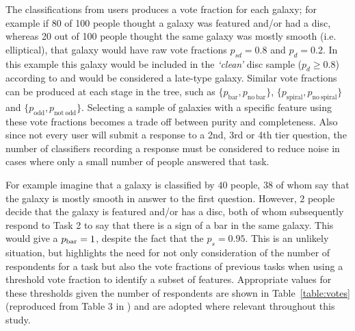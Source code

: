 
The classifications from users produces a vote fraction for each galaxy; for example if 80 of 100 people thought a galaxy was featured and/or had a disc, whereas 20 out of 100 people thought the same galaxy was mostly smooth (i.e. elliptical), that galaxy would have raw vote fractions $p_{sd} = 0.8$ and $p_{d} = 0.2$. In this example this galaxy would be included in the \emph{`clean'} disc sample ($p_d \geq 0.8$) according to \cite{GZ2} and would be considered a late-type galaxy. Similar vote fractions can be produced at each stage in the tree, such as $\{p_{\mathrm{bar}}, p_{\mathrm{no~bar}}\}$, $\{p_{\mathrm{spiral}}, p_{\mathrm{no~spiral}}\}$ and $\{p_{\mathrm{odd}}, p_{\mathrm{not~odd}}\}$. Selecting a sample of galaxies with a specific feature using these vote fractions becomes a trade off between purity and completeness. Also since not every user will submit a response to a 2nd, 3rd or 4th tier question, the number of classifiers recording a response must be considered to reduce noise in cases where only a small number of people answered that task. 

For example imagine that a galaxy is classified by $40$ people, $38$ of whom say that the galaxy is mostly smooth in answer to the first question. However, $2$ people decide that the galaxy is featured and/or has a disc, both of whom subsequently respond to Task 2 to say that there is a sign of a bar in the same galaxy. This would give a $p_{\rm{bar}}=1$, despite the fact that the $p_s = 0.95$. This is an unlikely situation, but highlights the need for not only consideration of the number of respondents for a task but also the vote fractions of previous tasks when using a threshold vote fraction to identify a subset of features. Appropriate values for these thresholds given the number of respondents are shown in Table~\ref{table:votes} (reproduced from Table 3 in \citealt{GZ2}) and are adopted where relevant throughout this study. 

